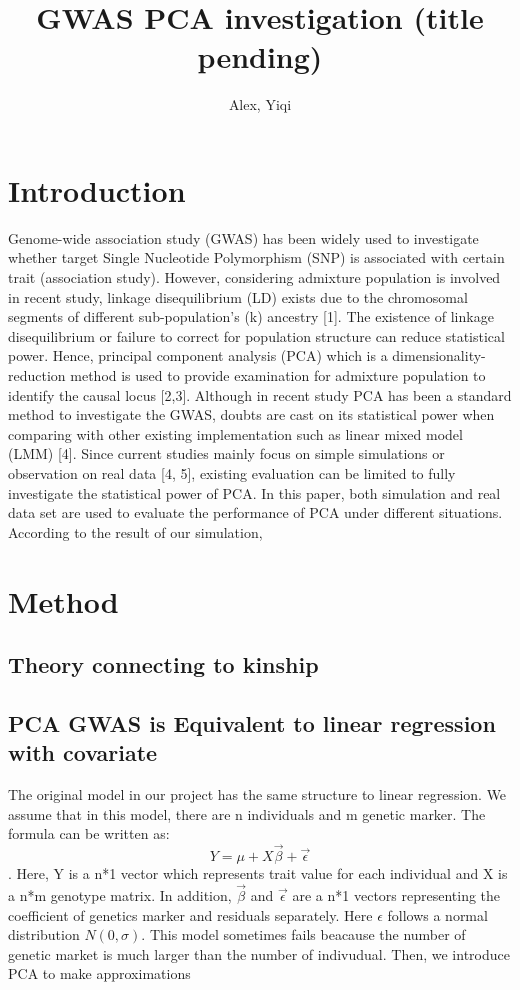 \documentclass[12pt]{article}
\title{GWAS PCA investigation (title pending)}
\author{Alex, Yiqi }
\theoremstyle{definition}
\theoremstyle{plain}
\begin{document}
	\maketitle
	
	
\section{Introduction} 

Genome-wide association study (GWAS) has been widely used to investigate whether target Single Nucleotide Polymorphism (SNP) is associated with certain trait (association study). However, considering admixture population is involved in recent study, linkage disequilibrium (LD) exists due to the chromosomal segments of different sub-population's (k) ancestry [1]. The existence of linkage disequilibrium or failure to correct for population structure can reduce statistical power. Hence, principal component analysis (PCA) which is a dimensionality-reduction method is used to provide examination for admixture population to identify the causal locus [2,3]. Although in recent study PCA has been a standard method to investigate the GWAS, doubts are cast on its statistical power when comparing with other existing implementation such as linear mixed model (LMM) [4]. Since current studies mainly focus on simple simulations or observation on real data [4, 5], existing evaluation can be limited to fully investigate the statistical power of PCA. In this paper, both simulation and real data set are used to evaluate the performance of PCA under different situations.\\

According to the result of our simulation, 

\section{Method} 
\subsection{Theory connecting to kinship}

\subsection{PCA GWAS  is Equivalent to linear regression with covariate}
The original model in our project has the same structure to linear regression. We assume that in this model, there are n individuals and m genetic marker. The formula can be written as: $$Y=\mu+X \vec{\beta}+\vec{\epsilon}$$. Here, Y is a n*1 vector which represents trait value for each individual and X is a n*m genotype matrix. In addition, $\vec{\beta}$ and $\vec{\epsilon}$ are a n*1 vectors representing the coefficient of genetics marker and residuals separately. Here $\epsilon$ follows a normal distribution $N(0,\sigma)$. This model sometimes fails beacause the number of genetic market is much larger than the number of indivudual. Then, we introduce PCA to make approximations\\
\end{document}
